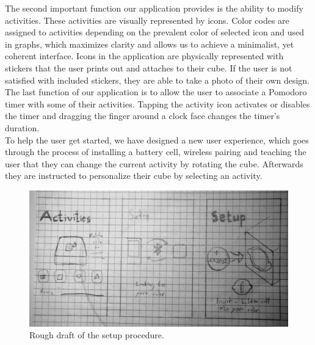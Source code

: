 \documentclass{article}
\begin{document}
The second important function our application provides is the ability to modify activities. These activities are visually represented by icons. Color codes are assigned to activities depending on the prevalent color of selected icon and used in graphs, which maximizes clarity and allows us to achieve a minimalist, yet coherent interface. Icons in the application are physically represented with stickers that the user prints out and attaches to their cube. If the user is not satisfied with included stickers, they are able to take a photo of their own design.\\

The last function of our application is to allow the user to associate a Pomodoro timer with some of their activities. Tapping the activity icon activates or disables the timer and dragging the finger around a clock face changes the timer's duration.\\

To help the user get started, we have designed a new user experience, which goes through the process of installing a battery cell, wireless pairing and teaching the user that they can change the current activity by rotating the cube. Afterwards they are instructed to personalize their cube by selecting an activity.

\begin{figure}[H]
\centering
\includegraphics[scale=1.6]{draft_intro.jpg}
\caption{Rough draft of the setup procedure.}
\label{fig:draft2}
\end{figure}

\newpage
\end{document}
